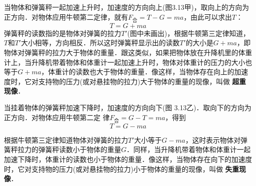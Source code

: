 当物体和弹簧秤一起加速上升时，加速度的方向向上(图3.13甲)，取向上的方向为正方向．对物体应用牛顿第二定律，就有$F_{\text{合}}=T-G=ma$，由此可以求出$T$：
\[ T=G+ma\]
弹簧秤的读数指的是物体对弹簧的拉力$T'$(图中未画出)，根据牛顿第三定律知道，$T$和$T'$大小相等，方向相反．所以这时弹簧秤显示出的读数$T'$的大小是$G+ma$，即物体对弹簧秤的拉力大于物体的重量．跟这类似，如果把物体放在升降机里的体重计上，当升降机带着物体和体重计一起加速上升时，物体对体重计的压力的大小也等于$G+ma$，体重计的读数也大于物体的重量．像这样，当物体存在向上的加速度时，它对支持物的压力(或对悬挂物的拉力)大于物体的重量的现像，叫做\textbf{ 超重现像}．

当挂着物体的弹簧秤加速下降时，加速度的方向向下(图
3.13乙)．取向下的方向为正方向．对物体应用牛顿第二定
律$F_{\text{合}}=G-T=ma$，得到
\[T=G-ma\]

根据牛顿第三定律知道物体对弹簧的拉力$T'$大小等于$G-ma$，这时表示物体对弹簧秤拉力的弹簧秤读数小于物体的重量$G$．同样，当升降机带着物体和体重计一起加速下降时，体重计的读数也小于物体的重量．像这样，当物体存在向下的加速度时，它对支持物的压力(或对悬挂物的拉力)小于物体的重量的现像，叫做\textbf{ 失重现像}．

